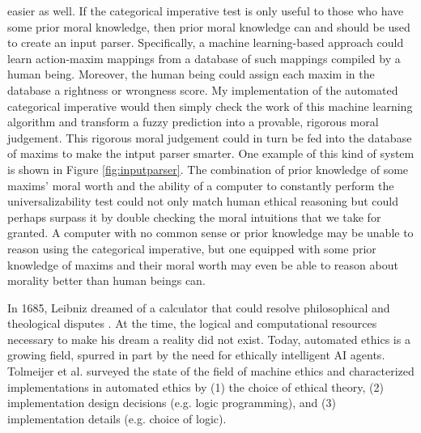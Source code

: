 \begin{isabellebody}
\begin{isamarkuptext}
easier as well. 
If the categorical imperative test is only useful to those who have some prior moral knowledge, then prior moral
knowledge can and should be used to create an input parser. Specifically, a machine learning-based approach
could learn action-maxim mappings from a database of such mappings compiled by a human being. Moreover, 
the human being could assign each maxim in the database a rightness or wrongness score. My implementation
of the automated categorical imperative would then simply check the work of this machine learning algorithm and transform
a fuzzy prediction into a provable, rigorous moral judgement. This rigorous moral judgement
could in turn be fed into the database of maxims to make the intput parser smarter. One example of 
this kind of system is shown in Figure \ref{fig:inputparser}. The combination of 
prior knowledge of some maxims' moral worth and the ability of a computer to constantly perform the
universalizability test could not only match human ethical reasoning but could perhaps surpass it
by double checking the moral intuitions that we take for granted. A computer with no common sense or prior knowledge
may be unable to reason using the categorical imperative, but one equipped with some prior knowledge
of maxims and their moral worth may even be able to reason about morality better than human beings can.%
\end{isamarkuptext}\isamarkuptrue%
%
\isadelimdocument
%
\endisadelimdocument
%
\isatagdocument
%
\isamarkuptrue%
%
\endisatagdocument
{\isafolddocument}%
%
\isadelimdocument
%
\endisadelimdocument
%
\begin{isamarkuptext}%
In 1685, Leibniz dreamed of a calculator that could resolve philosophical and theological 
disputes \citep{leibniz}. At the time, the logical and computational resources necessary to make his 
dream a reality did not exist. Today, automated ethics is a growing field, spurred in part by the 
need for ethically intelligent AI agents. Tolmeijer et al. surveyed the state of the field of 
machine ethics \citep{mesurvey} and characterized implementations in automated ethics by (1) the choice 
of ethical theory, (2) implementation design decisions (e.g. logic programming), and (3) implementation 
details (e.g. choice of logic). 


\end{isamarkuptext}
\end{isabellebody}

